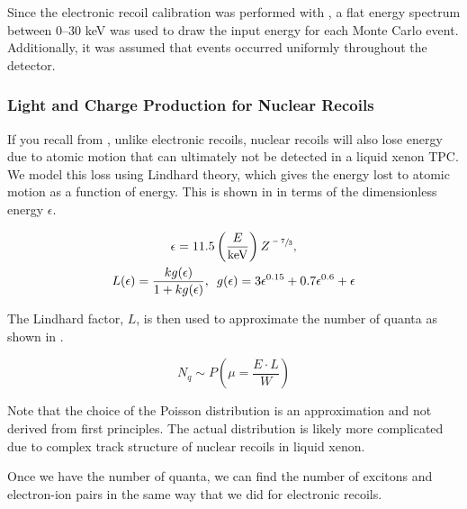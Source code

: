 

Since the electronic recoil calibration was performed with , a flat energy spectrum between 0--30 keV was used to draw the input energy for each Monte Carlo event.  Additionally, it was assumed that events occurred uniformly throughout the detector.



\subsubsection{Light and Charge Production for Nuclear Recoils}
\label{sec:xe1t_mc_observables_production_nr}

If you recall from , unlike electronic recoils, nuclear recoils will also lose energy due to atomic motion that can ultimately not be detected in a liquid xenon TPC.  We model this loss using Lindhard theory, which gives the energy lost to atomic motion as a function of energy.  This is shown in  in terms of the dimensionless energy $\epsilon$.

\begin{equation}
        \label{eqn:xe1t_lindhard}
        \begin{gathered}
                \epsilon = 11.5 \left( \frac{E}{\textrm{keV}} \right) Z^{\sfrac{-7}{3}}, \\
                L(\epsilon) = \frac{k g(\epsilon)}{1 + k g(\epsilon)}, \, \, \, g(\epsilon) = 3 \epsilon^{0.15} + 0.7 \epsilon^{0.6} + \epsilon
        \end{gathered}
\end{equation}

The Lindhard factor, $L$, is then used to approximate the number of quanta as shown in .

\begin{equation}
        \label{eqn:xe1t_nr_quanta}
        N_q \sim P \left( \mu = \frac{E \cdot L}{W} \right)
\end{equation}

Note that the choice of the Poisson distribution is an approximation and not derived from first principles.  The actual distribution is likely more complicated due to complex track structure of nuclear recoils in liquid xenon.

Once we have the number of quanta, we can find the number of excitons and electron-ion pairs in the same way that we did for electronic recoils.


